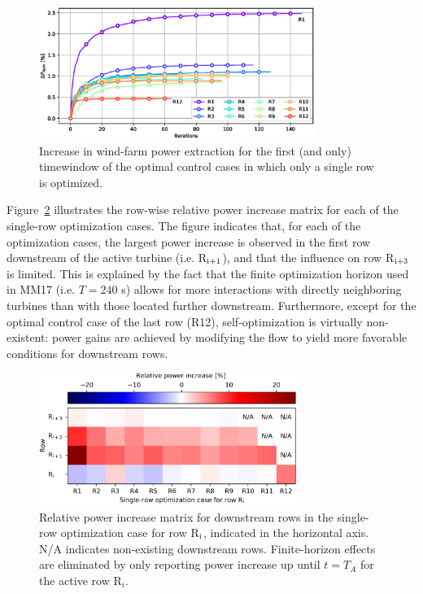 \documentclass[wes, manuscript]{copernicus}
\begin{document}
\begin{figure}
	\centering
	\includegraphics[width=0.8\textwidth]{figure9}
	\caption{Increase in wind-farm power extraction for the first (and only) timewindow of the optimal control cases in which only a single row is optimized. \label{fig:single_row_opt}}
\end{figure}

Figure~\ref{fig:gains_singlerow} illustrates the row-wise relative power increase matrix for each of the single-row optimization cases. The figure indicates that, for each of the optimization cases, the largest power increase is observed in the first row downstream of the active turbine (i.e. R$_{\rm i+1}$), and that the influence on row R$_{\rm i+3}$ is limited. This is explained by the fact that the finite optimization horizon used in MM17 (i.e. $T = 240$ s) allows for more interactions with directly neighboring turbines than with those located further downstream. Furthermore, except for the optimal control case of the last row (R12), self-optimization is virtually non-existent: power gains are achieved by modifying the flow to yield more favorable conditions for downstream rows. 

\begin{figure}
	\centering
	\includegraphics[width=0.75\textwidth]{figure10}
	\caption{Relative power increase matrix for downstream rows in the single-row optimization case for row R$_{\rm i}$, indicated in the horizontal axis. N/A indicates non-existing downstream rows. Finite-horizon effects are eliminated by only reporting power increase up until $t = T_A$ for the active row R$_i$. \label{fig:gains_singlerow}}
\end{figure}
\end{document}
